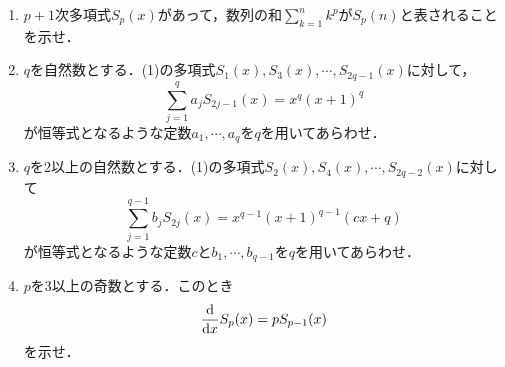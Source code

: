 \documentclass[unicode,12pt, A4j]{ltjsarticle}%
\begin{document}
\begin{enumerate}
 \item $p+1$次多項式$S_p(x)$があって，数列の和$\sum_{k=1}^{n}k^p$が$S_p(n)$と表されることを示せ．
 \item $q$を自然数とする．(1)の多項式$S_1(x), S_3(x),\cdots,S_{2q-1}(x)$に対して，
       \begin{equation}
	\sum_{j=1}^{q}a_{j}S_{2j-1}(x)=x^q(x+1)^q
       \end{equation}
       が恒等式となるような定数$a_1,\cdots,a_q$を$q$を用いてあらわせ．
 \item $q$を$2$以上の自然数とする．(1)の多項式$S_2(x),S_4(x),\cdots,S_{2q-2}(x)$に対して
       \begin{equation}
	\sum_{j=1}^{q-1}b_{j}S_{2j}(x)=x^{q-1}(x+1)^{q-1}(cx+q)
       \end{equation}
       が恒等式となるような定数$c$と$b_1,\cdots,b_{q-1}$を$q$を用いてあらわせ．
 \item $p$を$3$以上の奇数とする．このとき
       \begin{equation}
	\dv{x}S_{p}(x)=pS_{p-1}(x)
       \end{equation}
       を示せ．
\end{enumerate}
\end{document}
